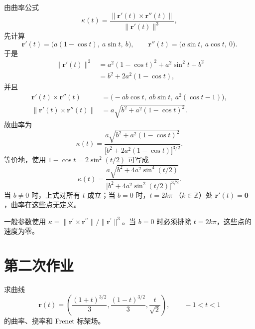 \begin{solution}
由曲率公式
\[
\kappa(t)
=\frac{\lVert\bm r'(t)\times\bm r''(t)\rVert}
{\lVert\bm r'(t)\rVert^3},
\]
先计算
\[
\bm r'(t)
=\bigl(a(1-\cos t),\ a\sin t,\ b\bigr),
\qquad
\bm r''(t)
=\bigl(a\sin t,\ a\cos t,\ 0\bigr).
\]
于是
\begin{align*}
\lVert\bm r'(t)\rVert^2
&=a^2(1-\cos t)^2+a^2\sin^2t+b^2\\
&=b^2+2a^2(1-\cos t),
\end{align*}
并且
\begin{align*}
\bm r'(t)\times\bm r''(t)
&=\bigl(-ab\cos t,\ ab\sin t,\ a^2(\cos t-1)\bigr),\\
\lVert\bm r'(t)\times\bm r''(t)\rVert
&=a\sqrt{b^2+a^2(1-\cos t)^2}.
\end{align*}
故曲率为
\[
\boxed{
\kappa(t)
=\frac{a\sqrt{b^2+a^2(1-\cos t)^2}}
{\bigl[b^2+2a^2(1-\cos t)\bigr]^{3/2}}
}.
\]
等价地，使用 $1-\cos t=2\sin^2(t/2)$ 可写成
\[
\boxed{
\kappa(t)
=\frac{a\sqrt{b^2+4a^2\sin^4(t/2)}}
{\bigl[b^2+4a^2\sin^2(t/2)\bigr]^{3/2}}
}.
\]
当 $b\neq0$ 时，上式对所有 $t$ 成立；当 $b=0$ 时，$t=2k\pi$
（$k\in\mathbb Z$）处 $\bm r'(t)=\bm0$，曲率在这些点无定义。
\end{solution}

\begin{dxtips}[曲率公式先检查正则性]\label{hw:curves:tip3}
一般参数使用 $\kappa=\lVert\bm r^{\prime}\times\bm r^{\prime\prime}\rVert/\lVert\bm r^{\prime}\rVert^3$。当 $b=0$ 时必须排除 $t=2k\pi$，这些点的速度为零。
\end{dxtips}


\clearpage
\section{第二次作业}
\label{hw:curves:second}
\begin{homework}[教材第45页，习题2.4，第7题]
\par\smallskip
求曲线
\[
\bm r(t)=\left(\frac{(1+t)^{3/2}}3,\frac{(1-t)^{3/2}}3,
\frac{t}{\sqrt2}\right),\qquad -1<t<1
\]
的曲率、挠率和 Frenet 标架场。
\end{homework}

